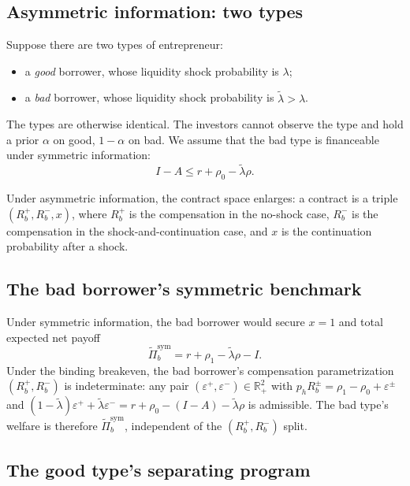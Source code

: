 \documentclass[11pt,a4paper,oneside]{book}
\def\R{\mathbb{R}}
\def\leq{\leqslant}
\theoremstyle{plain}
\theoremstyle{definition}
\theoremstyle{remark}
\numberwithin{equation}{chapter}
\begin{document}
\subsection{Asymmetric information: two types}

Suppose there are two types of entrepreneur:
\begin{itemize}
  \item a \emph{good} borrower, whose liquidity shock probability is $\lambda$;
  \item a \emph{bad} borrower, whose liquidity shock probability is $\widetilde{\lambda} > \lambda$.
\end{itemize}
The types are otherwise identical.
The investors cannot observe the type and hold a prior $\alpha$ on good, $1 - \alpha$ on bad.
We assume that the bad type is financeable under symmetric information:
\begin{equation*}
  I - A \leq r + \rho_0 - \widetilde{\lambda} \rho.
\end{equation*}

Under asymmetric information, the contract space enlarges: a contract is a triple $(R_b^+, R_b^-, x)$, where $R_b^+$ is the compensation in the no-shock case, $R_b^-$ is the compensation in the shock-and-continuation case, and $x$ is the continuation probability after a shock.

\subsection{The bad borrower's symmetric benchmark}

Under symmetric information, the bad borrower would secure $x = 1$ and total expected net payoff
\begin{equation}\label{eq:diss-short-bad-sym}
  \widetilde{\Pi}_b^{\text{sym}} = r + \rho_1 - \widetilde{\lambda} \rho - I.
\end{equation}
Under the binding breakeven, the bad borrower's compensation parametrization $(R_b^+, R_b^-)$ is indeterminate: any pair $(\varepsilon^+, \varepsilon^-) \in \R_+^2$ with $p_h R_b^\pm = \rho_1 - \rho_0 + \varepsilon^\pm$ and $(1 - \widetilde{\lambda}) \varepsilon^+ + \widetilde{\lambda} \varepsilon^- = r + \rho_0 - (I - A) - \widetilde{\lambda} \rho$ is admissible.
The bad type's welfare is therefore $\widetilde{\Pi}_b^{\text{sym}}$, independent of the $(R_b^+, R_b^-)$ split.

\subsection{The good type's separating program}
\end{document}
